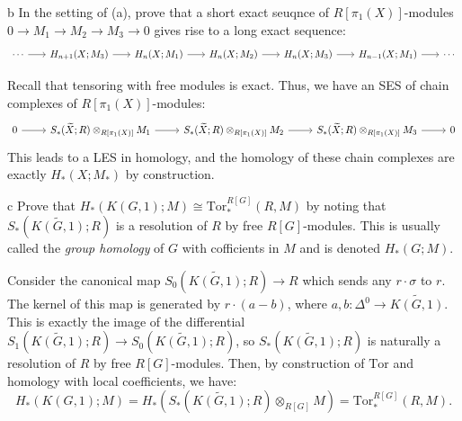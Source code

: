 \documentclass[11pt,letterpaper]{article}
\def\Tor{\mathrm{Tor}}
\begin{document}
\begin{solution}
    \begin{partproblem}{b}
        In the setting of (a), prove that a short exact seuqnce of $R[\pi_1(X)]$-modules $0 \to M_1 \to M_2 \to M_3 \to 0$ gives rise to a long exact sequence:
        \[\begin{tikzcd}[column sep = scriptsize]
            \cdots & H_{n+1}(X; M_3) & H_n(X; M_1) & H_n(X; M_2) & H_n(X; M_3) & H_{n-1}(X; M_1) & \cdots
            \arrow[from=1-1, to=1-2]
            \arrow[from=1-2, to=1-3]
            \arrow[from=1-3, to=1-4]
            \arrow[from=1-4, to=1-5]
            \arrow[from=1-5, to=1-6]
            \arrow[from=1-6, to=1-7]
        \end{tikzcd}\]
    \end{partproblem}
    \quad Recall that tensoring with free modules is exact. Thus, we have an SES of chain complexes of $R[\pi_1(X)]$-modules:
    \[\begin{tikzcd}
        0 & {S_*(\widetilde{X}; R)\otimes_{R[\pi_1(X)]} M_1} & {S_*(\widetilde{X}; R)\otimes_{R[\pi_1(X)]} M_2} & {S_*(\widetilde{X}; R)\otimes_{R[\pi_1(X)]} M_3} & 0
        \arrow[from=1-1, to=1-2]
        \arrow[from=1-2, to=1-3]
        \arrow[from=1-3, to=1-4]
        \arrow[from=1-4, to=1-5]
    \end{tikzcd}\]
    This leads to a LES in homology, and the homology of these chain complexes are exactly $H_*(X; M_*)$ by construction.

    \begin{partproblem}{c}
        Prove that $H_*(K(G,1); M)\cong \Tor^{R[G]}_*(R, M)$ by noting that $S_*(\widetilde{K(G,1)}; R)$ is a resolution of $R$ by free $R[G]$-modules. This is usually called the \emph{group homology} of $G$ with cofficients in $M$ and is denoted $H_*(G; M)$.
    \end{partproblem}

    \quad Consider the canonical map $S_0(\widetilde{K(G,1)}; R) \to R$ which sends any $r\cdot \sigma$ to $r$. The kernel of this map is generated by $r\cdot (a - b)$, where $a,b : \Delta^0 \to \widetilde{K(G,1)}$. This is exactly the image of the differential $S_1(\widetilde{K(G,1)}; R) \to S_0(\widetilde{K(G,1)}; R)$, so $S_*(\widetilde{K(G,1)}; R)$ is naturally a resolution of $R$ by free $R[G]$-modules. Then, by construction of $\Tor$ and homology with local coefficients, we have:
    \[
        H_*(K(G,1);M) =H_*(S_*(\widetilde{K(G,1)}; R)\otimes_{R[G]} M) = \Tor_*^{R[G]}(R, M)
    .\] 
\end{solution}
\end{document}
